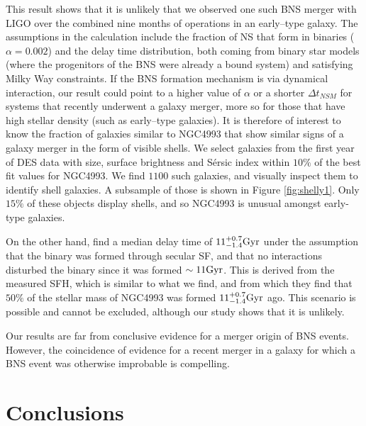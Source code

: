 This result shows that it is unlikely that we observed one such BNS merger with LIGO over the combined nine months of operations in an early--type galaxy. The assumptions in the calculation include the fraction of NS that form in binaries ($\alpha=0.002$) and the delay time distribution, both coming from binary star models (where the progenitors of the BNS were already a bound system) and satisfying Milky Way constraints. If the BNS formation mechanism is via dynamical interaction, our result could point to a higher value of $\alpha$ or a shorter $\Delta t_{NSM}$ for systems that recently underwent a galaxy merger, more so for those that have high stellar density (such as early--type galaxies). It is therefore of interest to know the fraction of galaxies similar to NGC4993 that show similar signs of a galaxy merger in the form of visible shells. We select galaxies from the first year of DES data with size, surface brightness and S\'ersic index within $10\%$ of the best fit values for NGC4993. We find $1100$ such galaxies, and visually inspect them to identify shell galaxies. A subsample of those is shown in Figure \ref{fig:shelly1}. Only $15\%$ of these objects display shells, and so NGC4993 is unusual amongst early-type galaxies.

On the other hand, \citet{blanchard} find a median delay time of $11^{+0.7}_{-1.4} {\rm Gyr}$ under the assumption that the binary was formed through secular SF, and that no interactions disturbed the binary since it was formed $\sim 11 {\rm Gyr}$. This is derived from the measured SFH, which is similar to what we find, and from which they find that $50\%$ of the stellar mass of NGC4993 was formed $11^{+0.7}_{-1.4} {\rm Gyr}$ ago. This scenario is possible and cannot be excluded, although our study shows that it is unlikely.

Our results are far from conclusive evidence for a merger origin of BNS events. However, the coincidence of evidence for a recent merger in a galaxy for which a BNS event was otherwise improbable is compelling.

\section{Conclusions}

